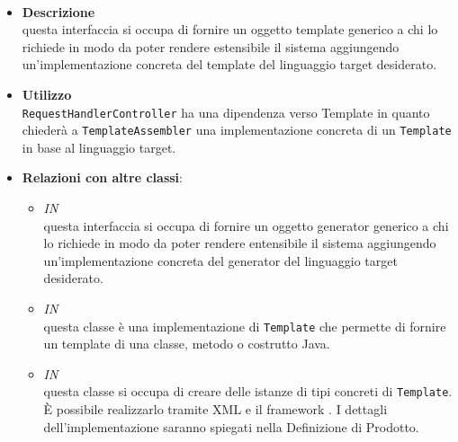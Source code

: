 \paragraph{}
\label{\nogloxy{SWEDesigner::Server::Template::Template}}
\begin{itemize}
\item \textbf{Descrizione}\\
questa interfaccia si occupa di fornire un oggetto template generico a chi lo richiede in modo da poter rendere estensibile il sistema aggiungendo un'implementazione concreta del template del linguaggio target desiderato.
\item \textbf{Utilizzo}\\
\texttt{RequestHandlerController} ha una dipendenza verso Template in quanto chiederà a \texttt{TemplateAssembler} una implementazione concreta di un \texttt{Template} in base al linguaggio target.
\item \textbf{Relazioni con altre classi}:
\begin{itemize}
\item \textit{IN} \hyperref[\nogloxy{SWEDesigner::Server::Generator::Generator}]{}\\
questa interfaccia si occupa di fornire un oggetto generator generico a chi lo richiede in modo da poter rendere entensibile il sistema aggiungendo un'implementazione concreta del generator del linguaggio target desiderato.
\item \textit{IN} \hyperref[\nogloxy{SWEDesigner::Server::Template::Java::JavaTemplate}]{}\\
questa classe è una implementazione di \texttt{Template} che permette di fornire un template di una classe, metodo o costrutto Java.
\item \textit{IN} \hyperref[\nogloxy{SWEDesigner::Server::Template::TemplateAssembler}]{}\\
questa classe si occupa di creare delle istanze di tipi concreti di \texttt{Template}. È possibile realizzarlo tramite XML e il framework \spring. I dettagli dell'implementazione saranno spiegati nella Definizione di Prodotto. %
\end{itemize}
\end{itemize}

